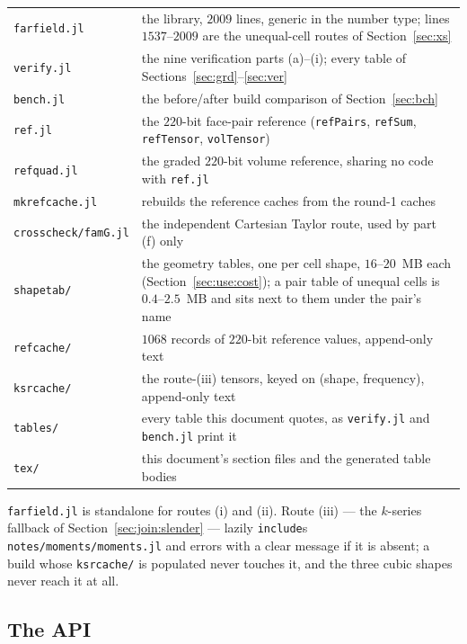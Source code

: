 \documentclass[11pt]{article}
\theoremstyle{remark}
\newcommand{\code}[1]{\texttt{#1}}
\begin{document}
\begin{center}\small
\begin{tabular}{@{}lL{0.72\textwidth}@{}}
\toprule
\code{farfield.jl} & the library, $2009$ lines, generic in the number type; lines
$1537$--$2009$ are the unequal-cell routes of Section~\ref{sec:xs}\\
\code{verify.jl} & the nine verification parts (a)--(i); every table of
Sections~\ref{sec:grd}--\ref{sec:ver}\\
\code{bench.jl} & the before/after build comparison of Section~\ref{sec:bch}\\
\code{ref.jl} & the $220$-bit face-pair reference (\code{refPairs}, \code{refSum},
\code{refTensor}, \code{volTensor})\\
\code{refquad.jl} & the graded $220$-bit volume reference, sharing no code with
\code{ref.jl}\\
\code{mkrefcache.jl} & rebuilds the reference caches from the round-1 caches\\
\code{crosscheck/famG.jl} & the independent Cartesian Taylor route, used by part (f) only\\
\code{shapetab/} & the geometry tables, one per cell shape, $16$--$20$~MB each
(Section~\ref{sec:use:cost}); a pair table of unequal cells is $0.4$--$2.5$~MB and sits
next to them under the pair's name\\
\code{refcache/} & $1068$ records of $220$-bit reference values, append-only text\\
\code{ksrcache/} & the route-(iii) tensors, keyed on (shape, frequency), append-only text\\
\code{tables/} & every table this document quotes, as \code{verify.jl} and \code{bench.jl}
print it\\
\code{tex/} & this document's section files and the generated table bodies\\
\bottomrule
\end{tabular}
\end{center}

\noindent
\code{farfield.jl} is standalone for routes (i) and (ii). Route (iii) --- the $k$-series
fallback of Section~\ref{sec:join:slender} --- lazily \code{include}s
\code{notes/moments/moments.jl} and errors with a clear message if it is absent; a build
whose \code{ksrcache/} is populated never touches it, and the three cubic shapes never
reach it at all.

\subsection{The API}
\label{sec:use:api}
\end{document}
